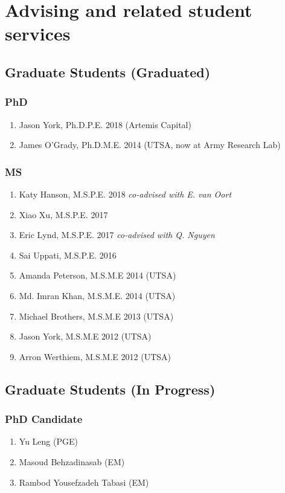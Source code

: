 \section*{Advising and related student services}



\subsection*{Graduate Students (Graduated)}

\subsubsection*{PhD}
\begin{enumerate}
    \item Jason York, Ph.D.P.E. 2018 (Artemis Capital) 
    \item James O'Grady, Ph.D.M.E. 2014 (UTSA, now at Army Research Lab)
\end{enumerate}

\subsubsection*{MS}
\begin{enumerate}
    \item Katy Hanson, M.S.P.E. 2018 \emph{co-advised with E. van Oort}
    \item Xiao Xu, M.S.P.E. 2017
    \item Eric Lynd, M.S.P.E. 2017  \emph{co-advised with Q. Nguyen}
    \item Sai Uppati, M.S.P.E. 2016
    \item Amanda Peterson, M.S.M.E 2014 (UTSA)
    \item Md. Imran Khan, M.S.M.E. 2014 (UTSA)
    \item Michael Brothers, M.S.M.E 2013 (UTSA)
    \item Jason York, M.S.M.E 2012 (UTSA)
    \item Arron Werthiem, M.S.M.E 2012 (UTSA)
\end{enumerate}

\subsection*{Graduate Students (In Progress)}

\subsubsection*{PhD Candidate}
\begin{enumerate}
    \item Yu Leng (PGE)
    \item Masoud Behzadinasab (EM)
    \item Rambod Yousefzadeh Tabasi (EM)
\end{enumerate}

